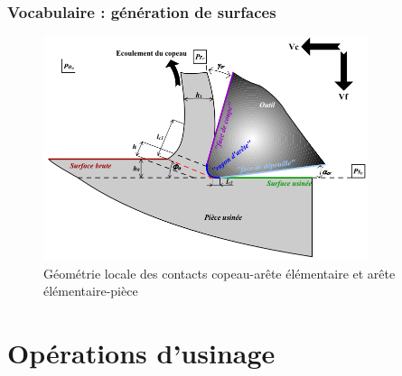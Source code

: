 \documentclass[
	11pt, %
	fleqn, %
	a4paper, %
]{LegrandOrangeBook}
\begin{document}
\subsection{Vocabulaire : génération de surfaces}

\begin{figure}[H] %
	\centering %

	\includegraphics[width=0.85\textwidth]{Images/plaquette1.PNG} %
	\caption{Géométrie locale des contacts copeau-arête élémentaire et arête élémentaire-pièce}
	\label{fig:placeholder} %

\end{figure}



\chapterspaceabove{6.25cm} %
\chapterspacebelow{7.5cm} %


\chapter{Opérations d'usinage}
\end{document}
